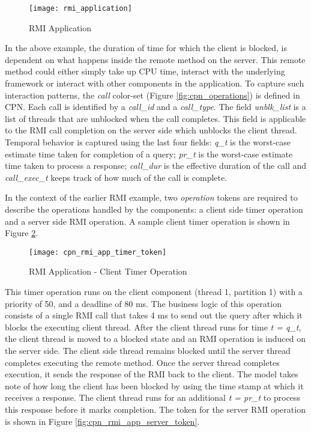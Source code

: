 \begin{figure}[ht]
\centering
\texttt{[image: rmi\_application]}
\caption{RMI Application}
\label{fig:rmi_application}
\vspace{-0.2in}
\end{figure}
\vspace{0.1in}

In the above example, the duration of time for which the client is blocked, is dependent on what happens inside the remote method on the server. This remote method could either simply take up CPU time, interact with the underlying framework or interact with other components in the application. To capture such interaction patterns, the \emph{call} color-set (Figure \ref{fig:cpn_operations}) is defined in CPN. Each call is identified by a \emph{call\_id} and a \emph{call\_type}. The field \emph{unblk\_list} is a list of threads that are unblocked when the call completes. This field is applicable to the RMI call completion on the server side which unblocks the client thread. Temporal behavior is captured using the last four fields: \emph{q\_t} is the worst-case estimate time taken for completion of a query; \emph{pr\_t} is the worst-case estimate time taken to process a response; \emph{call\_dur} is the effective duration of the call and \emph{call\_exec\_t} keeps track of how much of the call is complete. 

In the context of the earlier RMI example, two \emph{operation} tokens are required to describe the operations handled by the components: a client side timer operation and a server side RMI operation. A sample client timer operation is shown in Figure \ref{fig:cpn_rmi_app_timer_token}.

\vspace{-0.08in}
\begin{figure}[ht]
\centering
\texttt{[image: cpn\_rmi\_app\_timer\_token]}
\caption{RMI Application - Client Timer Operation}
\label{fig:cpn_rmi_app_timer_token}
\vspace{-0.16in}
\end{figure}


This timer operation runs on the client component (thread 1, partition 1) with a priority of 50, and a deadline of 80 ms. The business logic of this operation consists of a single RMI call that takes 4 ms to send out the query after which it blocks the executing client thread. After the client thread runs for time \emph{t = q\_t}, the client thread is moved to a blocked state and an RMI operation is induced on the server side. The client side thread remains blocked until the server thread completes executing the remote method. Once the server thread completes execution, it sends the response of the RMI back to the client. The model takes note of how long the client has been blocked by using the time stamp at which it receives a response. The client thread runs for an additional \emph{t = pr\_t} to process this response before it marks completion. The token for the server RMI operation is shown in Figure \ref{fig:cpn_rmi_app_server_token}.

